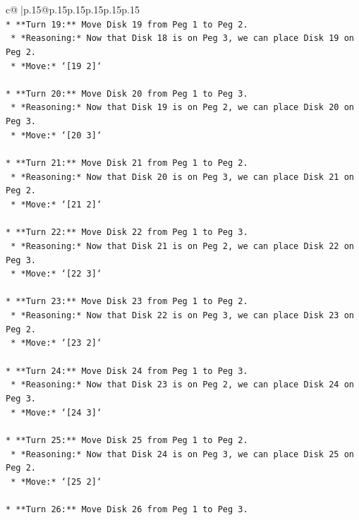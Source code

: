 \documentclass{article}
\begin{document}
{\begin{supertabular}{c@{$\;$}|p{.15\linewidth}@{}p{.15\linewidth}p{.15\linewidth}p{.15\linewidth}p{.15\linewidth}p{.15\linewidth}}
{{{\\ 
\texttt{*   **Turn 19:** Move Disk 19 from Peg 1 to Peg 2.} \\
\texttt{    *   *Reasoning:* Now that Disk 18 is on Peg 3, we can place Disk 19 on Peg 2.} \\
\texttt{    *   *Move:* `{[}19 2{]}`} \\
\\ 
\texttt{*   **Turn 20:** Move Disk 20 from Peg 1 to Peg 3.} \\
\texttt{    *   *Reasoning:* Now that Disk 19 is on Peg 2, we can place Disk 20 on Peg 3.} \\
\texttt{    *   *Move:* `{[}20 3{]}`} \\
\\ 
\texttt{*   **Turn 21:** Move Disk 21 from Peg 1 to Peg 2.} \\
\texttt{    *   *Reasoning:* Now that Disk 20 is on Peg 3, we can place Disk 21 on Peg 2.} \\
\texttt{    *   *Move:* `{[}21 2{]}`} \\
\\ 
\texttt{*   **Turn 22:** Move Disk 22 from Peg 1 to Peg 3.} \\
\texttt{    *   *Reasoning:* Now that Disk 21 is on Peg 2, we can place Disk 22 on Peg 3.} \\
\texttt{    *   *Move:* `{[}22 3{]}`} \\
\\ 
\texttt{*   **Turn 23:** Move Disk 23 from Peg 1 to Peg 2.} \\
\texttt{    *   *Reasoning:* Now that Disk 22 is on Peg 3, we can place Disk 23 on Peg 2.} \\
\texttt{    *   *Move:* `{[}23 2{]}`} \\
\\ 
\texttt{*   **Turn 24:** Move Disk 24 from Peg 1 to Peg 3.} \\
\texttt{    *   *Reasoning:* Now that Disk 23 is on Peg 2, we can place Disk 24 on Peg 3.} \\
\texttt{    *   *Move:* `{[}24 3{]}`} \\
\\ 
\texttt{*   **Turn 25:** Move Disk 25 from Peg 1 to Peg 2.} \\
\texttt{    *   *Reasoning:* Now that Disk 24 is on Peg 3, we can place Disk 25 on Peg 2.} \\
\texttt{    *   *Move:* `{[}25 2{]}`} \\
\\ 
\texttt{*   **Turn 26:** Move Disk 26 from Peg 1 to Peg 3.} \\
}}}
\end{supertabular}}
\end{document}
